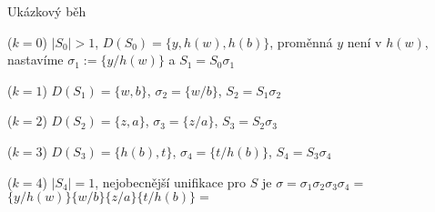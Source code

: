 \documentclass{beamer}
\begin{document}
\begin{frame}{Ukázkový běh}
    \vspace{-6pt}

    \vspace{-1pt}
    
    \alert{($k=0$)} $|S_0|>1$, $D(S_0)=\{y,h(w),h(b)\}$, proměnná $y$ není v $h(w)$, nastavíme $\sigma_1:=\{y/h(w)\}$ a $S_1=S_0\sigma_1$
    

    \vspace{-1pt}

    \alert{($k=1$)} $D(S_1)=\{w,b\}$, $\sigma_2=\{w/b\}$, $S_2=S_1\sigma_2$    
    

    \vspace{-1pt}
        
    \alert{($k=2$)} $D(S_2)=\{z,a\}$, $\sigma_3=\{z/a\}$, $S_3=S_2\sigma_3$    
    

    \vspace{-1pt}

    \alert{($k=3$)} $D(S_3)=\{h(b),t\}$, $\sigma_4=\{t/h(b)\}$, $S_4=S_3\sigma_4$    
    

    \vspace{-1pt}

    \alert{($k=4$)} $|S_4|=1$, nejobecnější unifikace pro $S$ je
    $\sigma=\sigma_1\sigma_2\sigma_3\sigma_4=$\\    
    $\{y/h(w)\}\{w/b\}\{z/a\}\{t/h(b)\}=$    

\end{frame}
\end{document}
